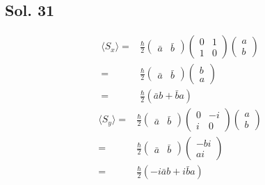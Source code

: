    \subsection*{Sol. 31}
   \begin{align*}
       \langle S_x\rangle =& 
       \frac{\hbar}{2}
       \begin{pmatrix}
           \bar a & \bar b
       \end{pmatrix}
       \begin{pmatrix}
           0 & 1 \\
           1 & 0
       \end{pmatrix}
       \begin{pmatrix}
           a \\ b 
       \end{pmatrix}\\
       =&
       \frac{\hbar}{2}
        \begin{pmatrix}
           \bar a & \bar b
       \end{pmatrix}
       \begin{pmatrix}
           b \\ a 
       \end{pmatrix}\\
       =&\frac{\hbar}{2}(\bar a b + \bar b a)
\end{align*}
        \begin{align*}
       \langle S_y\rangle =& 
       \frac{\hbar}{2}
       \begin{pmatrix}
           \bar a & \bar b
       \end{pmatrix}
       \begin{pmatrix}
           0 & -i \\
           i & 0
       \end{pmatrix}
       \begin{pmatrix}
           a \\ b 
       \end{pmatrix}\\
       =&
       \frac{\hbar}{2}
        \begin{pmatrix}
           \bar a & \bar b
       \end{pmatrix}
       \begin{pmatrix}
           -bi \\ ai 
       \end{pmatrix}\\
       =&\frac{\hbar}{2}(-i\bar a b + i\bar b a)
   \end{align*}
